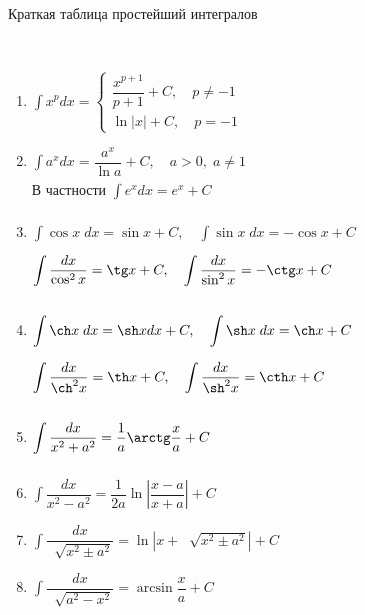 \documentclass[../main.tex]{subfiles}
\begin{document}
\begin{prop}{Краткая таблица простейший интегралов}

    ~

    \begin{enumerate}
        \item \( \displaystyle\int\limits_{ }^{ } x^pdx=
        \begin{cases}
            \dfrac{ x^{p+1}}{ p+1} + C,\quad p \neq -1\\
            \ln \left| x\right|+C,\quad p=-1 
        \end{cases}\)
        \item \( \displaystyle\int\limits_{ }^{ } a^xdx= \dfrac{ a^x}{ \ln a} +C,\quad a >0,\;a \neq 1\)\\
        В частности \( \displaystyle\int\limits_{ }^{ } e^xdx=e^x+C\)
        \item \( \displaystyle\int\limits_{ }^{ } \cos x\;dx=\sin x+C,\quad \displaystyle\int\limits_{ }^{ } \sin x\;dx=- \cos x+C\)\\ 
        \( \displaystyle\int\limits_{ }^{ } \dfrac{ dx}{ \cos ^2 x} = \tg x+C,\quad \displaystyle\int\limits_{ }^{ } \dfrac{ dx}{ \sin^2x} =-\ctg x + C\)
        \item \( \displaystyle\int\limits_{ }^{ } \ch x\;dx= \sh x dx+C,\quad \displaystyle\int\limits_{ }^{ } \sh x \; dx= \ch x + C\)\\ 
        \( \displaystyle\int\limits_{ }^{ } \dfrac{ dx}{ \ch^2 x} = \th x + C,\quad \displaystyle\int\limits_{ }^{ } \dfrac{ dx}{ \sh^2 x}= \cth x + C \)
        \item \( \displaystyle\int\limits_{ }^{ } \dfrac{ dx}{ x^2+a^2} = \dfrac{ 1}{ a} \arctg \dfrac{ x}{ a} +C\)
        \item \( \displaystyle\int\limits_{ }^{ } \dfrac{ dx}{ x^2-a^2} = \dfrac{ 1}{ 2a} \ln \left| \dfrac{ x-a}{ x+a} \right|+C\)
        \item \( \displaystyle\int\limits_{ }^{ } \dfrac{ dx}{ \;\sqrt[]{x^2 \pm a^2}} = \ln \left| x+ \;\sqrt[]{x^2\pm a^2}\right|+C \) 
        \item \( \displaystyle\int\limits_{ }^{ } \dfrac{ dx}{ \;\sqrt[]{a^2-x^2}} =\arcsin \dfrac{ x}{ a} +C\)
    \end{enumerate}
\end{prop}
\end{document}
